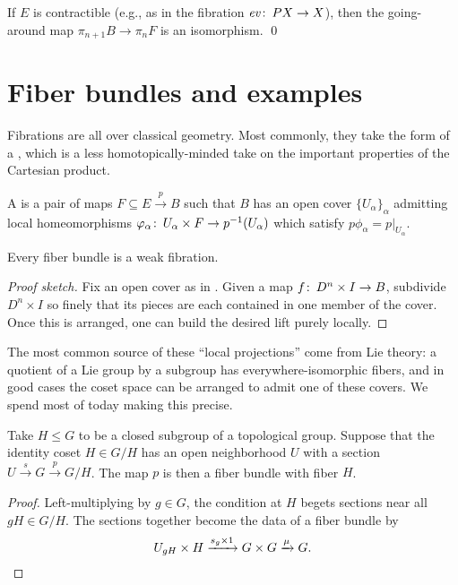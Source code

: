 \begin{corollary}
If $E$ is contractible (e.g., as in the fibration $\mathit{ev}\colon\thinspace PX \to X$), then the going-around map $\pi_{n+1} B \to \pi_n F$ is an isomorphism. \qed
\end{corollary}




\section{Fiber bundles and examples}

Fibrations are all over classical geometry.
Most commonly, they take the form of a , which is a less homotopically-minded take on the important properties of the Cartesian product.

\begin{definition}\label{FiberBundleDefn}%
A  is a pair of maps $F \subseteq E \xrightarrow p B$ such that $B$ has an open cover $\{U_\alpha\}_\alpha$ admitting local homeomorphisms $\varphi_\alpha\colon\thinspace U_\alpha \times F \to p^{-1}(U_\alpha)$ which satisfy $p \phi_\alpha = p|_{U_\alpha}$.
\end{definition}

\begin{lemma}
Every fiber bundle is a weak fibration.
\end{lemma}
\begin{proof}[Proof sketch]
Fix an open cover as in .  Given a map $f\colon\thinspace D^n \times I \to B$, subdivide $D^n \times I$ so finely that its pieces are each contained in one member of the cover.  Once this is arranged, one can build the desired lift purely locally.
\end{proof}

The most common source of these ``local projections'' come from Lie theory: a quotient of a Lie group by a subgroup has everywhere-isomorphic fibers, and in good cases the coset space can be arranged to admit one of these covers.
We spend most of today making this precise.

\begin{lemma}
Take $H \le G$ to be a closed subgroup of a topological group.
Suppose that the identity coset $H \in G/H$ has an open neighborhood $U$ with a section $U \xrightarrow s G \xrightarrow p G/H$.
The map $p$ is then a fiber bundle with fiber $H$.
\end{lemma}
\begin{proof}
Left-multiplying by $g \in G$, the condition at $H$ begets sections near all $gH \in G/H$.
The sections together become the data of a fiber bundle by \[U_{gH} \times H \xrightarrow{s_g \times 1} G \times G \xrightarrow\mu G. \qedhere\]
\end{proof}

